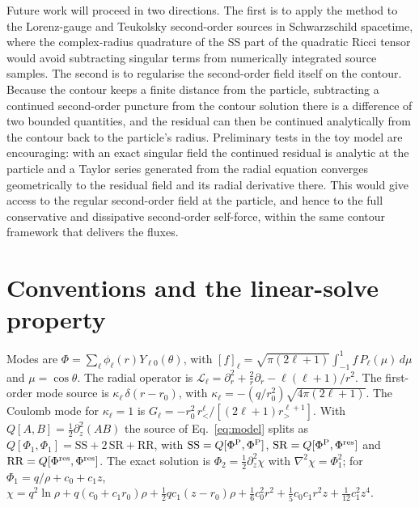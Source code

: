 \documentclass[aps,prd,twocolumn,superscriptaddress,nofootinbib,floatfix]{revtex4-2}
\newcommand{\PhiP}{\Phi^{\rm P}}
\newcommand{\Pres}{\Phi^{\rm res}}
\newcommand{\Lop}{\mathcal{L}_\ell}
\begin{document}
Future work will proceed in two directions.
The first is to apply the method to the Lorenz-gauge and Teukolsky second-order sources in Schwarzschild spacetime, where the complex-radius quadrature of the SS part of the quadratic Ricci tensor would avoid subtracting singular terms from numerically integrated source samples.
The second is to regularise the second-order field itself on the contour.
Because the contour keeps a finite distance from the particle, subtracting a continued second-order puncture from the contour solution there is a difference of two bounded quantities, and the residual can then be continued analytically from the contour back to the particle's radius.
Preliminary tests in the toy model are encouraging: with an exact singular field the continued residual is analytic at the particle and a Taylor series generated from the radial equation converges geometrically to the residual field and its radial derivative there.
This would give access to the regular second-order field at the particle, and hence to the full conservative and dissipative second-order self-force, within the same contour framework that delivers the fluxes.


\appendix

\section{Conventions and the linear-solve property}\label{app:conventions}
Modes are $\Phi=\sum_\ell\phi_\ell(r)Y_{\ell0}(\theta)$, with $[f]_\ell=\sqrt{\pi(2\ell+1)}\int_{-1}^1 f\,P_\ell(\mu)\,d\mu$ and $\mu=\cos\theta$.
The radial operator is $\Lop=\partial_r^2+\tfrac2r\partial_r-\ell(\ell+1)/r^2$.
The first-order mode source is $\kappa_\ell\,\delta(r-r_0)$, with $\kappa_\ell=-(q/r_0^2)\sqrt{4\pi(2\ell+1)}$.
The Coulomb mode for $\kappa_\ell=1$ is $G_\ell=-r_0^2\,r_<^\ell/[(2\ell+1)r_>^{\ell+1}]$.
With $Q[A,B]=\tfrac12\partial_z^2(AB)$ the source of Eq.~\eqref{eq:model} splits as $Q[\Phi_1,\Phi_1]=\mathrm{SS}+2\,\mathrm{SR}+\mathrm{RR}$, with $\mathrm{SS}=Q[\PhiP,\PhiP]$, $\mathrm{SR}=Q[\PhiP,\Pres]$ and $\mathrm{RR}=Q[\Pres,\Pres]$.
The exact solution is $\Phi_2=\tfrac12\partial_z^2\chi$ with $\nabla^2\chi=\Phi_1^2$; for $\Phi_1=q/\rho+c_0+c_1z$, $\chi=q^2\ln\rho+q(c_0+c_1r_0)\rho+\tfrac12qc_1(z-r_0)\rho+\tfrac16c_0^2r^2+\tfrac15c_0c_1r^2z+\tfrac1{12}c_1^2z^4$.
\end{document}
